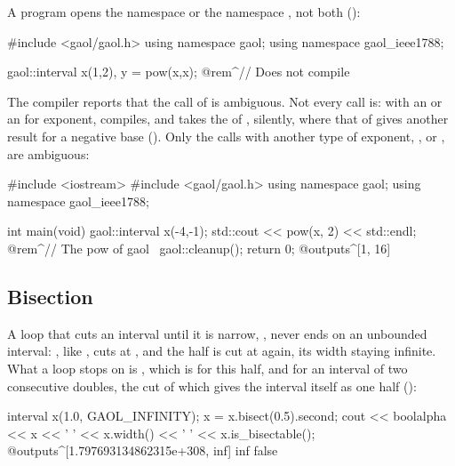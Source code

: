 A program opens the namespace  or the namespace
, not both ():

\begin{example}
#include <gaol/gaol.h>
using namespace gaol;
using namespace gaol_ieee1788;

gaol::interval x(1,2), y = pow(x,x); @rem^// Does not compile~
\end{example}

\noindent
The compiler reports that the call of  is ambiguous. Not every call
is: with an  or an  for exponent, 
compiles, and takes the  of , silently, where that of
 gives another result for a negative base
(). Only the calls with another type of exponent,
,  or , are
ambiguous:\newinvfive

\begin{example}
#include <iostream>
#include <gaol/gaol.h>
using namespace gaol;
using namespace gaol_ieee1788;

int main(void)
{
  gaol::interval x(-4,-1);
  std::cout << pow(x, 2) << std::endl; @rem^// The pow of gaol~
  gaol::cleanup();
  return 0;
}
@outputs^[1, 16]~
\end{example}

\subsection{Bisection}
%

A loop that cuts an interval until it is narrow,
, never ends on an unbounded interval:
, like , cuts  at
, and the half  is cut at
 again, its width staying infinite. What a loop stops on is
, which is  for this half, and for an
interval of two consecutive doubles, the cut of which gives the interval
itself as one half ():\newinvfive

\begin{example}
interval x(1.0, GAOL_INFINITY);
x = x.bisect(0.5).second;
cout << boolalpha << x << ' ' << x.width() << ' '
     << x.is_bisectable();
@outputs^[1.797693134862315e+308, inf] inf false~
\end{example}

